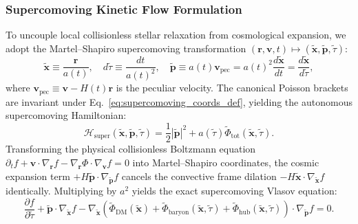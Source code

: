 \documentclass[11pt,onecolumn]{article}
\begin{document}
\subsubsection{Supercomoving Kinetic Flow Formulation}
To uncouple local collisionless stellar relaxation from cosmological expansion, we adopt the Martel--Shapiro supercomoving transformation $(\mathbf{r}, \mathbf{v}, t) \mapsto (\mathbf{\tilde{x}}, \mathbf{\tilde{p}}, \tilde{\tau})$:
\begin{equation}
\mathbf{\tilde{x}} \equiv \frac{\mathbf{r}}{a(t)}, \quad
d\tilde{\tau} \equiv \frac{dt}{a(t)^2}, \quad
\mathbf{\tilde{p}} \equiv a(t) \mathbf{v}_{\mathrm{pec}} = a(t)^2 \frac{d\mathbf{\tilde{x}}}{dt} = \frac{d\mathbf{\tilde{x}}}{d\tilde{\tau}},
\label{eq:supercomoving_coords_def}
\end{equation}
where $\mathbf{v}_{\mathrm{pec}} \equiv \mathbf{v} - H(t)\mathbf{r}$ is the peculiar velocity. The canonical Poisson brackets are invariant under Eq.~\eqref{eq:supercomoving_coords_def}, yielding the autonomous supercomoving Hamiltonian:
\begin{equation}
\mathcal{H}_{\mathrm{super}}(\mathbf{\tilde{x}}, \mathbf{\tilde{p}}, \tilde{\tau}) = \frac{1}{2}|\mathbf{\tilde{p}}|^2 + a(\tilde{\tau})\tilde{\Phi}_{\mathrm{tot}}(\mathbf{\tilde{x}}, \tilde{\tau}).
\label{eq:supercomoving_hamiltonian_def}
\end{equation}
Transforming the physical collisionless Boltzmann equation $\partial_t f + \mathbf{v} \cdot \nabla_{\mathbf{r}} f - \nabla_{\mathbf{r}}\Phi \cdot \nabla_{\mathbf{v}} f = 0$ into Martel--Shapiro coordinates, the cosmic expansion term $+H \mathbf{\tilde{p}} \cdot \nabla_{\mathbf{\tilde{p}}} f$ cancels the convective frame dilation $-H \mathbf{\tilde{x}} \cdot \nabla_{\mathbf{\tilde{x}}} f$ identically. Multiplying by $a^2$ yields the exact supercomoving Vlasov equation:
\begin{equation}
\frac{\partial f}{\partial \tilde{\tau}} + \mathbf{\tilde{p}} \cdot \nabla_{\mathbf{\tilde{x}}} f - \nabla_{\mathbf{\tilde{x}}} \left( \tilde{\Phi}_{\mathrm{DM}}(\mathbf{\tilde{x}}) + \tilde{\Phi}_{\mathrm{baryon}}(\mathbf{\tilde{x}}, \tilde{\tau}) + \tilde{\Phi}_{\mathrm{hub}}(\mathbf{\tilde{x}}, \tilde{\tau}) \right) \cdot \nabla_{\mathbf{\tilde{p}}} f = 0.
\label{eq:supercomoving_vlasov_def}
\end{equation}
\end{document}
